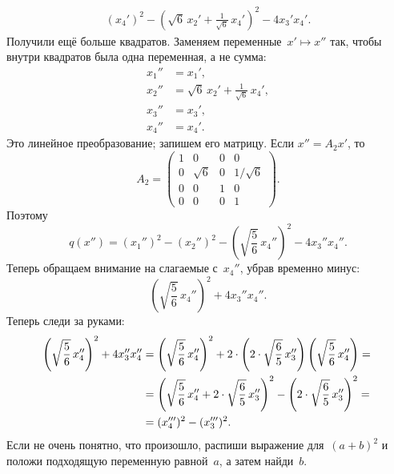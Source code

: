 \begin{solution}
\begin{align*}
		(x_4')^2
		-
		\left( 
			\sqrt{6}\,x_2' +
			\frac{1}{\sqrt{6}}\,x_4'
		\right)^2
		-
		4 x_3' x_4'
		.
	\end{align*}
	Получили ещё больше квадратов. Заменяем переменные~$x' \mapsto x''$ так, чтобы внутри квадратов была одна переменная, а не сумма:
	\begin{align*}
		x_1'' &= x_1',
		\\
		x_2'' &= \sqrt{6}\,x_2' + \frac{1}{\sqrt{6}}\,x_4',
		\\
		x_3'' &= x_3',
		\\
		x_4'' &= x_4'.
	\end{align*}
	Это линейное преобразование; запишем его матрицу. Если $x'' = A_2 x'$, то
	\[
		A_2 =
		\begin{pmatrix}
			1 & 0 & 0 & 0
			\\
			0 & \sqrt{6} & 0 & 1/\sqrt{6}
			\\
			0 & 0 & 1 & 0
			\\
			0 & 0 & 0 & 1
		\end{pmatrix}
		.
	\]
	Поэтому
	\begin{equation}
		\label{eq:num_08:q:x''}
		q(x'') =
		(x_1'')^2
		-
		(x_2'')^2
		-
		\left( 
			\sqrt{\frac{5}{6}}\,x_4''
		\right)^2
		-
		4 x_3'' x_4''
		.
	\end{equation}
	Теперь обращаем внимание на слагаемые с~$x_4''$, убрав временно минус:
	\[
		\left( 
			\sqrt{\frac{5}{6}}\,x_4''
		\right)^2
		+
		4 x_3'' x_4''
		.
	\]
	Теперь следи за руками:
	\begin{align*}
		\left( 
			\sqrt{\frac{5}{6}}\,x_4''
		\right)^2
		+
		4 x_3'' x_4''
		&=
		\left( 
			\sqrt{\frac{5}{6}}\,x_4''
		\right)^2
		+
		2 \cdot
		\left( 
			2 \cdot 
			\sqrt{\frac{6}{5}}
			\,
			x_3''
		\right)
		\left(
			\sqrt{\frac{5}{6}}\, x_4''
		\right)
		= {} \\ {} &=
		\left( 
			\sqrt{\frac{5}{6}}\,x_4''
			+
			2 \cdot 
			\sqrt{\frac{6}{5}}
			\,
			x_3''
		\right)^2
		-
		\left( 
			2 \cdot 
			\sqrt{\frac{6}{5}}
			\,
			x_3''
		\right)^2
		= {} \\ {} &=
		(x_4''')^2
		-
		(x_3''')^2
		.
	\end{align*}
	Если не очень понятно, что произошло, распиши выражение для~$(a+b)^2$ и положи подходящую переменную равной~$a$, а затем найди~$b$.


\end{solution}
